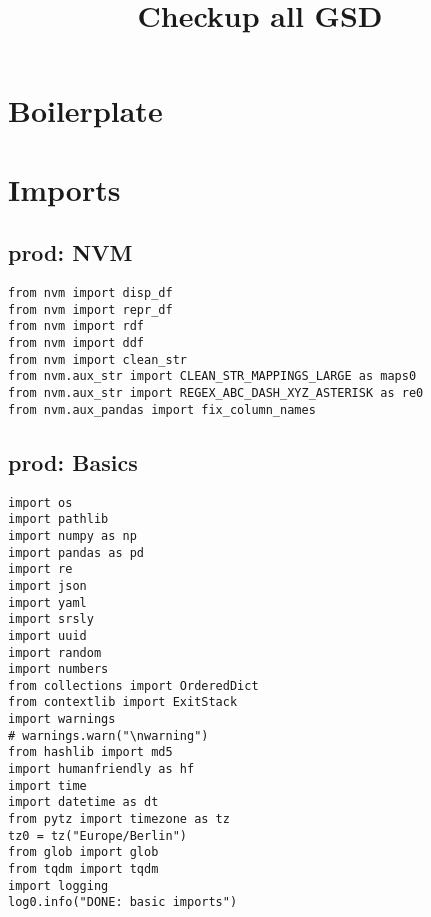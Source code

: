 \documentclass[a4paper,10pt,onecolumn,oneside,openright]{article}
\date{}
\title{Checkup all GSD}
\begin{document}
\maketitle



\section{Boilerplate}
\label{sec:orgfbd66a0}
\section{Imports}
\label{sec:org33ddc76}
\subsection{prod: NVM}
\label{sec:org180bf3d}
\begin{verbatim}
from nvm import disp_df
from nvm import repr_df
from nvm import rdf
from nvm import ddf
from nvm import clean_str
from nvm.aux_str import CLEAN_STR_MAPPINGS_LARGE as maps0
from nvm.aux_str import REGEX_ABC_DASH_XYZ_ASTERISK as re0
from nvm.aux_pandas import fix_column_names
\end{verbatim}

\subsection{prod: Basics}
\label{sec:orgf295055}
\begin{verbatim}
import os
import pathlib
import numpy as np
import pandas as pd
import re
import json
import yaml
import srsly
import uuid
import random
import numbers
from collections import OrderedDict
from contextlib import ExitStack
import warnings
# warnings.warn("\nwarning")
from hashlib import md5
import humanfriendly as hf
import time
import datetime as dt
from pytz import timezone as tz
tz0 = tz("Europe/Berlin")
from glob import glob
from tqdm import tqdm
import logging
log0.info("DONE: basic imports")
\end{verbatim}
\end{document}
